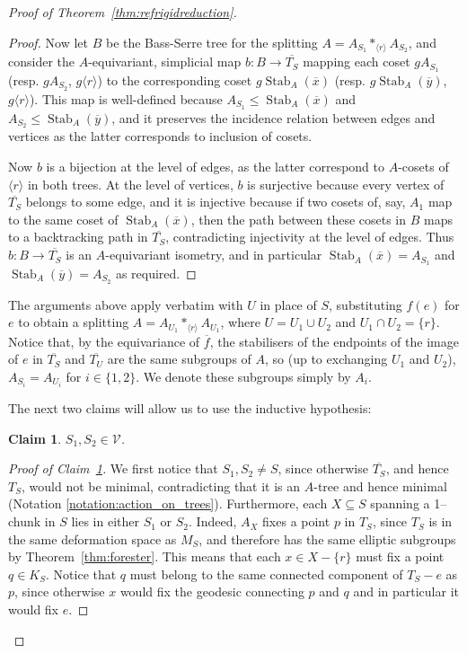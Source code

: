 \documentclass[svgnames]{amsart}
\theoremstyle{plain}
\newtheorem{claim}[thm]{Claim}
\theoremstyle{definition}
\newenvironment{claimproof}{\renewcommand{\qedsymbol}{$\blacksquare$}\begin{proof}}{\end{proof}}
\newcommand{\Stab}[2]{\operatorname{Stab}_{#1}\left(#2\right)}
\begin{document}
\begin{proof}[Proof of Theorem~\ref{thm:refrigidreduction}]
\begin{claimproof}
        Now let $B$ be the Bass-Serre tree for the splitting $A = A_{S_1} *_{\langle r \rangle} A_{S_2} $, and consider the $A$-equivariant, simplicial map $b\colon B\to \overline{T_S}$ mapping each coset $gA_{S_1}$ (resp. $gA_{S_2}$, $g\langle r\rangle$) to the corresponding coset $g\Stab{A}{\overline{x}}$ (resp. $g\Stab{A}{\overline{y}}$, $g\langle r\rangle$). This map is well-defined because $A_{S_1} \leq \Stab{A}{\overline{x}}$ and $A_{S_2} \leq \Stab{A}{\overline{y}}$, and it   preserves the incidence relation between edges and vertices as the latter corresponds to inclusion of cosets.
        
        Now $b$ is a bijection at the level of edges, as the latter correspond to $A$-cosets of $\langle r\rangle$ in both trees. At the level of vertices, $b$ is surjective because every vertex of $\overline{T_S}$ belongs to some edge, and it is injective because if two cosets of, say, $A_1$ map to the same coset of $\Stab{A}{\overline{x}}$, then the path between these cosets in $B$ maps to a backtracking path in $\overline{T_S}$, contradicting injectivity at the level of edges. Thus $b\colon B\to \overline{T_S}$ is an $A$-equivariant isometry, and in particular $\Stab{A}{\overline{x}} = A_{S_1}$ and $\Stab{A}{\overline{y}} = A_{S_2}$ as required.
    \end{claimproof}
            
    
    
    The arguments above apply verbatim with $U$ in place of $S$, substituting $f(e)$ for $e$ to obtain a splitting $A = A_{U_1} *_{\langle r \rangle} A_{U_1}$, where $U = U_1 \cup U_2$ and $U_1\cap U_2=\{r\}$. Notice that, by the equivariance of $\overline{f}$, the stabilisers of the endpoints of the image of $e$ in $\overline{T_S}$ and $\overline{T_U}$ are the same subgroups of $A$, so (up to exchanging $U_1$ and $U_2$), $A_{S_i} = A_{U_i}$ for $i \in \{1,2\}$. We denote these subgroups simply by $A_i$.
    
    The next two claims will allow us to use the inductive hypothesis:

    \begin{claim}\label{claim:S1_in_V} $S_1,S_2\in \mathcal V$.
    \end{claim}

    \begin{claimproof}[Proof of Claim~\ref{claim:S1_in_V}]
        We first notice that $S_1, S_2 \neq  S$, since otherwise $\overline{T_S}$, and hence $T_S$, would not be minimal, contradicting that it is an $A$-tree and hence minimal (Notation \ref{notation:action_on_trees}). Furthermore, each $X\subseteq S$ spanning a 1--chunk in $S$ lies in either $S_1$ or $S_2$. Indeed, $A_X$ fixes a point $p$ in $T_S$, since $T_S$ is in the same deformation space as $M_S$, and therefore has the same elliptic subgroups by Theorem~\ref{thm:forester}. This means that each $x\in X-\{r\}$ must fix a point $q\in K_S$. Notice that $q$ must belong to the same connected component of $T_S-e$ as $p$, since otherwise $x$ would fix the geodesic connecting $p$ and $q$ and in particular it would fix $e$.


\end{claimproof}
\end{proof}
\end{document}
